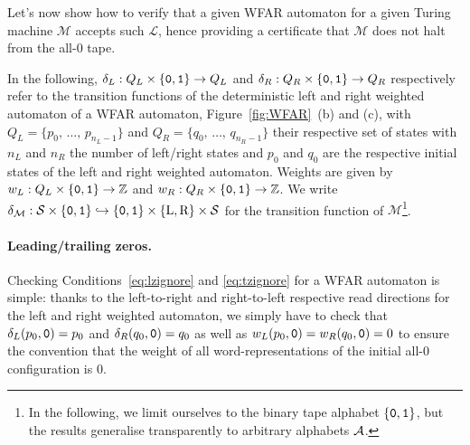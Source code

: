 Let's now show how to verify that a given WFAR automaton for a given Turing machine $\mathcal{M}$ accepts such $\mathcal{L}$, hence providing a certificate that $\mathcal{M}$ does not halt from the all-0 tape.

In the following, $\delta_L: Q_L \times \left\{\texttt{0},\texttt{1}\right\} \to Q_L$ and $\delta_R: Q_R \times \left\{\texttt{0},\texttt{1}\right\} \to Q_R$ respectively refer to the transition functions of the deterministic left and right weighted automaton of a WFAR automaton, \eg Figure~\ref{fig:WFAR}~(b) and (c), with $Q_L = \{p_0, \, \dots, \, p_{n_L-1}\}$ and $Q_R = \{q_0, \, \dots, \, q_{n_R-1}\}$ their respective set of states with $n_L$ and $n_R$ the number of left/right states and $p_0$ and $q_0$ are the respective initial states of the left and right weighted automaton. Weights are given by $w_L: Q_L \times \left\{\texttt{0},\texttt{1}\right\} \to \mathbb{Z}$ and $w_R: Q_R \times \left\{\texttt{0},\texttt{1}\right\} \to \mathbb{Z}$. We write $\delta_\mathcal{M}:\mathcal{S} \times \left\{\texttt{0},\texttt{1}\right\} \hookrightarrow \left\{\texttt{0},\texttt{1}\right\} \times \{\text{L},\text{R}\} \times \mathcal{S}$ for the transition function of $\mathcal{M}$\footnote{In the following, we limit ourselves to the binary tape alphabet $\left\{\texttt{0},\texttt{1}\right\}$, but the results generalise transparently to arbitrary alphabets $\mathcal{A}$.}.

\paragraph{Leading/trailing zeros.} Checking Conditions~\eqref{eq:lzignore} and \eqref{eq:tzignore} for a WFAR automaton is simple: thanks to the left-to-right and right-to-left respective read directions for the left and right weighted automaton, we simply have to check that $\delta_L(p_0,\texttt{0}) = p_0$ and $\delta_R(q_0,\texttt{0}) = q_0$ as well as $w_L(p_0,\texttt{0}) = w_R(q_0,\texttt{0}) = 0$ to ensure the convention that the weight of all word-representations of the initial all-0 configuration is 0.

